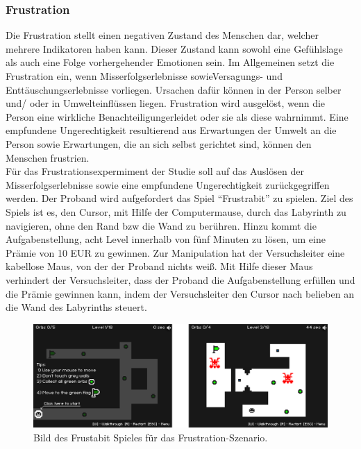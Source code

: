 \subsubsection{Frustration} \label{frust-1}



Die Frustration stellt einen negativen Zustand des Menschen dar, welcher mehrere Indikatoren haben kann. Dieser Zustand kann sowohl eine Gef{\"u}hlslage als auch eine Folge vorhergehender Emotionen sein.
Im Allgemeinen setzt die Frustration ein, wenn Misserfolgserlebnisse sowieVersagungs- und Entt{\"a}uschungserlebnisse vorliegen. 
Ursachen daf{\"u}r k{\"o}nnen in der Person selber und/ oder in Umwelteinfl{\"u}ssen liegen. 
Frustration wird ausgel{\"o}st, wenn die Person eine wirkliche Benachteiligungerleidet oder sie als diese wahrnimmt. 
Eine empfundene Ungerechtigkeit resultierend aus Erwartungen der Umwelt an die Person sowie Erwartungen, die an sich selbst gerichtet sind, k{\"o}nnen den Menschen frustrien. \\

F{\"u}r das Frustrationsexpermiment der Studie soll auf das Ausl{\"o}sen der Misserfolgserlebnisse sowie eine empfundene Ungerechtigkeit zur{\"u}ckgegriffen werden. Der Proband wird aufgefordert das Spiel ``Frustrabit'' zu spielen. 
Ziel des Spiels ist es, den Cursor, mit Hilfe der Computermause, durch das Labyrinth zu navigieren, ohne den Rand bzw die Wand zu ber{\"u}hren. 
Hinzu kommt die Aufgabenstellung, acht Level  innerhalb von f{\"u}nf Minuten zu l{\"o}sen, um eine Pr{\"a}mie von 10 EUR zu gewinnen.
Zur Manipulation hat der Versuchsleiter eine kabellose Maus, von der der Proband nichts wei{\ss}. 
Mit Hilfe dieser Maus verhindert der Versuchsleiter, dass der Proband die Aufgabenstellung erf{\"u}llen und die Pr{\"a}mie gewinnen kann, indem der Versuchsleiter den Cursor nach belieben an die Wand des Labyrinths steuert. 


\begin{figure}[H] \centering
\includegraphics[width=\textwidth]{Images/frustabit.png} 
\vspace{-0.3cm} 
\caption{Bild des Frustabit Spieles für das Frustration-Szenario.}
\label{fig-frust} 
\end{figure}